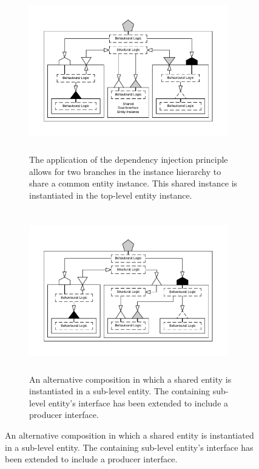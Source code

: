 \documentclass{article}
\begin{document}
\begin{landscape}
\begin{figure}[]
\begin{subfigure}[t]{0.5\linewidth}
    \end{subfigure}
    \begin{subfigure}[t]{0.5\linewidth}
        \centering\captionsetup{width=0.95\linewidth,belowskip=2em}%
        \caption{The application of the dependency injection principle allows for two branches in the instance hierarchy to share a common entity instance. This shared instance is instantiated in the top-level entity instance.}
        \label{fig:hierarchy-shared}
        \includegraphics[width=0.95\textwidth,height=7cm,keepaspectratio,trim=70px 70px 70px 70px, clip=true]{img/hierarchy-shared}%
    \end{subfigure}%
    \begin{subfigure}[t]{0.5\linewidth}
        \centering\captionsetup{width=0.95\linewidth,belowskip=2em}%
        \caption{An alternative composition in which a shared entity is instantiated in a sub-level entity. The containing sub-level entity's interface has been extended to include a producer interface.}
        \label{fig:hierarchy-semi-shared}
        \includegraphics[width=0.95\textwidth,height=7cm,keepaspectratio,trim=70px 70px 70px 70px, clip=true]{img/hierarchy-semi-shared}%
    \end{subfigure}
\end{figure}

\end{landscape}
\end{document}
